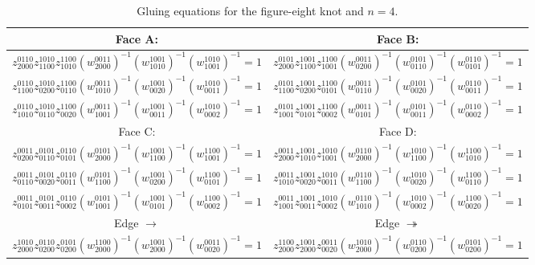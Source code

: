 \documentclass[12pt]{amsart}
\theoremstyle{definition}
\numberwithin{equation}{section}
\begin{document}
\begin{table}[p]
\caption{Gluing equations for the figure-eight knot and $n=4$.}\label{table:Figure8KnotEqns}
\begin{center}
\setlength\extrarowheight{5pt}
\begin{tabular}{c|c}
Face A: & Face B:\\ \hline \hline
$z_{2000}^{0110} z_{1100}^{1010} z_{1010}^{1100} (w_{2000}^{0011})^{-1}   (w_{1010}^{1001})^{-1} (w_{1001}^{1010})^{-1}  =1$ & 
$z^{0101}_{2000} z^{1001}_{1100} z^{1100}_{1001} (w^{0011}_{0200})^{-1} (w^{0101}_{0110})^{-1} (w^{0110}_{0101})^{-1} = 1$\\ \hline
$z_{1100}^{0110} z_{0200}^{1010} z_{0110}^{1100} (w_{1010}^{0011})^{-1}   (w_{0020}^{1001})^{-1} (w_{0011}^{1010})^{-1}  =1$ &
$z^{0101}_{1100} z^{1001}_{0200} z^{1100}_{0101} (w^{0011}_{0110})^{-1} (w^{0101}_{0020})^{-1} (w^{0110}_{0011})^{-1} = 1$\\ \hline
$z_{1010}^{0110} z_{0110}^{1010} z_{0020}^{1100} (w_{1001}^{0011})^{-1}   (w_{0011}^{1001})^{-1} (w_{0002}^{1010})^{-1}  =1$ &
$z^{0101}_{1001} z^{1001}_{0101} z^{1100}_{0002} (w^{0011}_{0101})^{-1} (w^{0101}_{0011})^{-1} (w^{0110}_{0002})^{-1} = 1$ \\ \hline
Face C: & Face D:\\ \hline \hline
$z^{0011}_{0200} z^{0101}_{0110} z^{0110}_{0101} (w^{0101}_{2000})^{-1} (w^{1001}_{1100})^{-1} (w^{1100}_{1001})^{-1} =1$ &
$z^{0011}_{2000} z^{1001}_{1010} z^{1010}_{1001} (w^{0110}_{2000})^{-1} (w^{1010}_{1100})^{-1} (w^{1100}_{1010})^{-1}=1$\\ \hline
$z^{0011}_{0110} z^{0101}_{0020} z^{0110}_{0011} (w^{0101}_{1100})^{-1} (w^{1001}_{0200})^{-1} (w^{1100}_{0101})^{-1} =1$ &
$z^{0011}_{1010} z^{1001}_{0020} z^{1010}_{0011} (w^{0110}_{1100})^{-1} (w^{1010}_{0020})^{-1} (w^{1100}_{0110})^{-1}=1$\\ \hline
$z^{0011}_{0101} z^{0101}_{0011} z^{0110}_{0002} (w^{0101}_{1001})^{-1} (w^{1001}_{0101})^{-1} (w^{1100}_{0002})^{-1} =1$ &
$z^{0011}_{1001} z^{1001}_{0011} z^{1010}_{0002} (w^{0110}_{1010})^{-1} (w^{1010}_{0002})^{-1} (w^{1100}_{0020})^{-1}=1$ \\ \hline
Edge $\rightarrow$ & Edge $\twoheadrightarrow$ \\ \hline \hline
$z_{2000}^{1010} z_{0200}^{0110} z_{0200}^{0101} (w_{2000}^{1100})^{-1} (w_{2000}^{1001})^{-1} (w_{0020}^{0011})^{-1} = 1$ &
$z_{2000}^{1100} z_{2000}^{1001} z_{0020}^{0011} (w_{2000}^{1010})^{-1} (w_{0200}^{0110})^{-1} (w_{0200}^{0101})^{-1}=1$ \\ \hline

\end{tabular}
\end{center}
\end{table}
\end{document}
